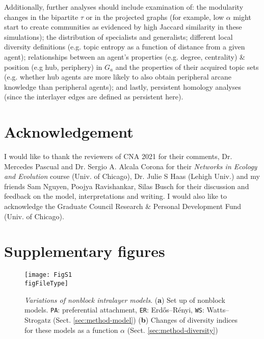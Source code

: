 \documentclass{svproc}
\def\figFileType{.eps}
\begin{document}
Additionally, further analyses should include examination of:
    the modularity changes in the bipartite $\tau$ \cite{Dankulov2015-uv} or in the projected graphs (for example, low $\alpha$ might start to create communities as evidenced by high Jaccard similarity in these simulations);
    the distribution of specialists and generalists;
    different local diversity definitions (e.g. topic entropy as a function of distance from a given agent);
    relationships between an agent's properties (e.g. degree, centrality) \& position (e.g hub, periphery) in $G_a$ and the properties of their acquired topic sets (e.g. whether hub agents are more likely to also obtain peripheral arcane knowledge than peripheral agents);
    and lastly, persistent homology analyses (since the interlayer edges are defined as persistent here).


\section{Acknowledgement}

I would like to thank
    the reviewers of CNA 2021 for their comments,
    Dr. Mercedes Pascual and Dr. Sergio A. Alcala Corona for their \textit{Networks in Ecology and Evolution} course (Univ. of Chicago),
    Dr. Julie S Haas (Lehigh Univ.)
    and my friends
        Sam Nguyen,
        Poojya Ravishankar,
        Silas Busch
for their discussion and feedback on the model, interpretations and writing.
I would also like to acknowledge the Graduate Council Research \& Personal Development Fund (Univ. of Chicago).




\vspace{-2em}

\section*{Supplementary figures}

\setcounter{figure}{0}
\renewcommand{\thefigure}{S\arabic{figure}}

\begin{figure}[!ht]
    \centering
    \texttt{[image: FigS1\\figFileType]}
    \caption{
    \textit{Variations of nonblock intralayer models}.
    (\textbf{a}) Set up of nonblock models.
    \texttt{PA}: preferential attachment,
    \texttt{ER}: Erdős–Rényi,
    \texttt{WS}: Watts–Strogatz (Sect. \ref{sec:method-model})
    (\textbf{b}) Changes of diversity indices for these models as a function $\alpha$ (Sect. \ref{sec:method-diversity})
    }
    \label{supp:1}
\end{figure}
\end{document}
